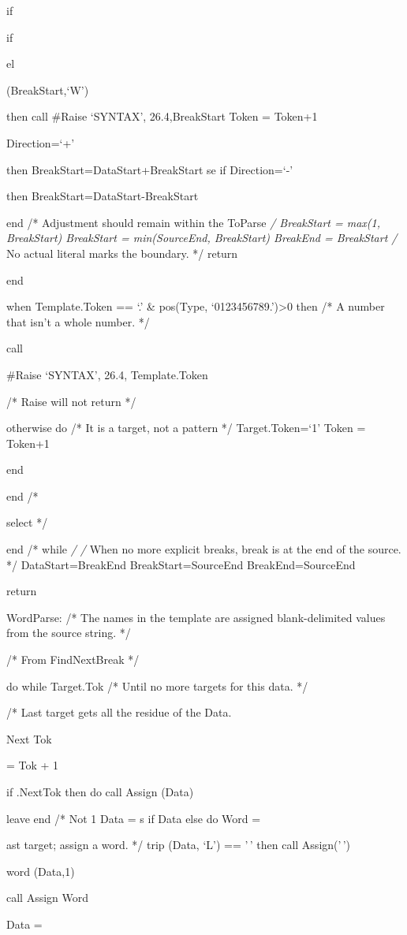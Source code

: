 if

if

el

\datatype (BreakStart,`W')

then call \#Raise `SYNTAX', 26.4,BreakStart Token = Token+1

Direction=`+'

then BreakStart=DataStart+BreakStart se if Direction=`-'

then BreakStart=DataStart-BreakStart

end /* Adjustment should remain within the ToParse \emph{/ BreakStart =
max(1, BreakStart) BreakStart = min(SourceEnd, BreakStart) BreakEnd =
BreakStart /} No actual literal marks the boundary. */ return

end

when Template.Token == `.' \& pos(Type, `0123456789.')\textgreater0 then
/* A number that isn't a whole number. */

call

\#Raise `SYNTAX', 26.4, Template.Token

/* Raise will not return */

otherwise do /* It is a target, not a pattern */ Target.Token=`1' Token
= Token+1

end

end /*

select */

end /* while \emph{/ /} When no more explicit breaks, break is at the
end of the source. */ DataStart=BreakEnd BreakStart=SourceEnd
BreakEnd=SourceEnd

return

WordParse: /* The names in the template are assigned blank-delimited
values from the source string. */

/* From FindNextBreak */

do while Target.Tok /* Until no more targets for this data. */

/* Last target gets all the residue of the Data.

Next Tok

= Tok + 1

if \Target.NextTok then do call Assign (Data)

leave end /* Not 1 Data = s if Data else do Word =

ast target; assign a word. */ trip (Data, `L') == '\,' then call
Assign('\,')

word (Data,1)

call Assign Word

Data =

